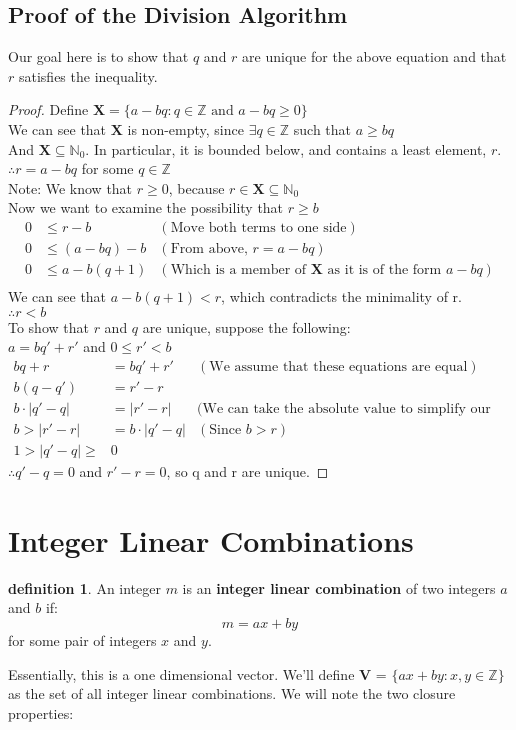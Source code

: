 \documentclass[10pt]{article}
\newcommand{\N}{\mathbb{N}}
\newcommand{\Z}{\mathbb{Z}}
\theoremstyle{definition}
\newtheorem{definition}[theorem]{definition}
\theoremstyle{remark}
\def\Z{\mathbb{ Z}}
\def\N{\mathbb{N}}
\newcommand{\mb}[1]{\mathbf{#1}}
\begin{document}
\subsection{Proof of the Division Algorithm}
Our goal here is to show that $q$ and $r$ are unique for the above equation and that $r$ satisfies the inequality.
\begin{proof}
Define $\mathbf{X} = \{ a-bq : q\in\Z \text{ and } a-bq \geq 0\}$\\
We can see that $\mb{X}$ is non-empty, since $\exists q\in\Z$ such that $a \geq bq$\\
And $\mb{X}\subseteq\N_0$.  In particular, it is bounded below, and contains a least element, $r$.\\
$\therefore r = a-bq$ for some $q\in\Z$\\
Note:  We know that $r\geq0$, because $r\in\mb{X}\subseteq\N_0$\\
\newline
Now we want to examine the possibility that $r\geq b$
\begin{align*}
0 &\leq r - b &(\text{Move both terms to one side})\\
0 &\leq (a-bq) - b &(\text{From above, }r = a-bq)\\
0 &\leq a-b(q+1) &(\text{Which is a member of }\mb{X}\text{ as it is of the form }a-bq)\\
\end{align*}
We can see that $a-b(q+1) < r$, which contradicts the minimality of r.\\
$\therefore r < b$\\
To show that $r$ and $q$ are unique, suppose the following:\\
$a=bq' + r'$ and $0 \leq r' < b$
\begin{align*}
bq + r &= bq' + r' &(\text{We assume that these equations are equal})\\
b(q-q') &= r'-r\\
b\cdot |q'-q| &= |r'-r| &(\text{We can take the absolute value to simplify our lives here}\\
b > |r'-r| &= b\cdot |q'-q| &(\text{Since } b > r)\\
1 > |q'-q|\geq& 0
\end{align*}
$\therefore q'-q = 0$ and $r'-r = 0$, so q and r are unique. 
\end{proof}




\section{Integer Linear Combinations}
\begin{definition}
An integer $m$ is an \textbf{integer linear combination} of two integers $a$ and $b$ if:
$$m = ax + by$$
for some pair of integers $x$ and $y$.
\end{definition}
Essentially, this is a one dimensional vector.  We'll define $\mb{V}$ = $\{ax + by : x,y \in \Z\}$ as the set of all integer linear combinations.  We will note the two closure properties:
\end{document}
